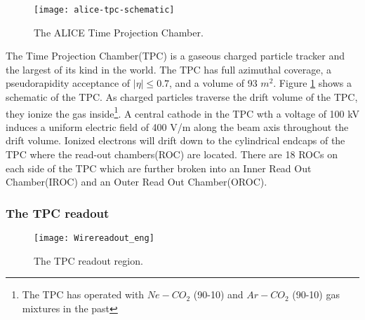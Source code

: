 \begin{figure}[h]
\texttt{[image: alice-tpc-schematic]}
\centering
\caption{The ALICE Time Projection Chamber\cite{2010NIMPA.622..316A}.}
\label{fig:TPC}
\end{figure}

The Time Projection Chamber(TPC)\cite{2010NIMPA.622..316A} is a gaseous charged particle tracker and the largest of its kind in the world.  The TPC has full azimuthal coverage, a pseudorapidity acceptance of $ \left | \eta \right | \leq 0.7$, and a volume of 93 $m^{2}$.  Figure \ref{fig:TPC} shows a schematic of the TPC.  As charged particles traverse the drift volume of the TPC, they ionize the gas inside\footnote{The TPC has operated with $Ne-CO_{2}$ (90-10) and $Ar-CO_{2}$ (90-10) gas mixtures in the past}.  A central cathode in the TPC wth a voltage of 100 kV induces a uniform electric field of 400 V/m along the beam axis throughout the drift volume.  Ionized electrons will drift down to the cylindrical endcaps of the TPC where the read-out chambers(ROC) are located.  There are 18 ROCs on each side of the TPC which are further broken into an Inner Read Out Chamber(IROC) and an Outer Read Out Chamber(OROC).  

\subsubsection{The TPC readout}\label{sec:tpcread}

\begin{figure}[h]
\texttt{[image: Wirereadout\_eng]}
\centering
\caption{The TPC readout region\cite{diener}.}
\label{fig:TPCreadout}
\end{figure}

